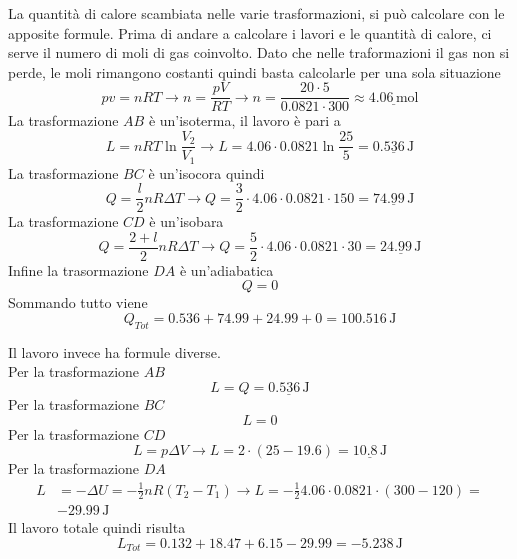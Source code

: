 La quantità di calore scambiata nelle varie trasformazioni, si può calcolare con le apposite formule.
Prima di andare a calcolare i lavori e le quantità di calore, ci serve il numero di moli di gas
coinvolto. Dato che nelle traformazioni il gas non si perde, le moli rimangono costanti quindi basta
calcolarle per una sola situazione
\begin{equation*}
  pv=nRT \rightarrow n = \frac{pV}{RT}\rightarrow n =
  \frac{20\cdot5}{0.0821\cdot300}\approx\underline{4.06\,\text{mol}}
\end{equation*}
La trasformazione $AB$ è un'isoterma, il lavoro è pari a 
\begin{equation*}
  L = nRT\ln\frac{V_2}{V_1} \rightarrow L = 4.06\cdot0.0821\ln\frac{25}{5}= \underline{0.536\,\text{J}}
\end{equation*}
La trasformazione $BC$ è un'isocora quindi
\begin{equation*}
  Q = \frac{l}{2}nR\Delta T \rightarrow Q =
  \frac{3}{2}\cdot4.06\cdot0.0821\cdot150=\underline{74.99\,\text{J}}
\end{equation*}
La trasformazione $CD$ è un'isobara
\begin{equation*}
  Q = \frac{2+l}{2}nR\Delta T\rightarrow Q =
  \frac{5}{2}\cdot4.06\cdot0.0821\cdot30=\underline{24.99\,\text{J}}
\end{equation*}
Infine la trasormazione $DA$ è un'adiabatica
\begin{equation*}
  Q = 0
\end{equation*}
Sommando tutto viene
\begin{equation*}
  Q_{Tot} = 0.536+74.99+24.99+0=\boxed{100.516\,\text{J}}
\end{equation*}

Il lavoro invece ha formule diverse.\\
Per la trasformazione $AB$
\begin{equation*}
  L=Q=\underline{0.536\,\text{J}}
\end{equation*}
Per la trasformazione $BC$
\begin{equation*}
  L=0
\end{equation*}
Per la trasformazione $CD$
\begin{equation*}
  L = p\Delta V\rightarrow L = 2\cdot(25-19.6) = \underline{10.8\,\text{J}}
\end{equation*}
Per la trasformazione $DA$
\begin{align*}
  L &= -\Delta U = -\frac{1}{2}nR(T_2-T_1) \rightarrow L = -\frac{1}{2}4.06\cdot0.0821\cdot(300-120) =\\
    &\boxed{-29.99\,\text{J}}
\end{align*}
Il lavoro totale quindi risulta
\begin{equation*}
  L_{Tot} = 0.132 + 18.47+6.15-29.99 = \boxed{-5.238\,\text{J}}
\end{equation*}

